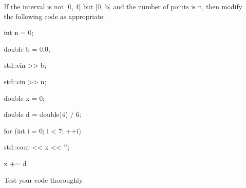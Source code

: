 If the interval is not [0, 4] but [0, b] and the number of points is n, then modify the following code as appropriate:

\begin{console}

int n = 0;

double b = 0.0;

std::cin >> b;

std::cin >> n;



double x = 0;

double d = double(4) / 6;

for (int i = 0; i < 7; ++i)

{   

    std::cout << x << '\n';

    x += d

}

\end{console}

Test your code thoroughly.

